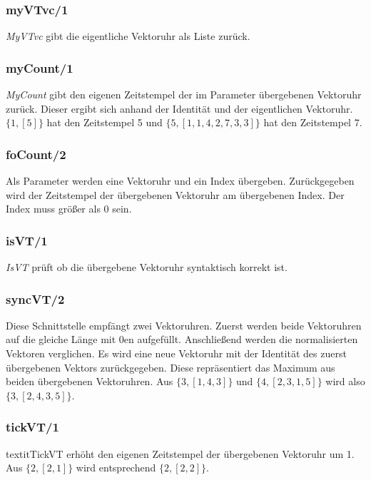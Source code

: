 \subsubsection{myVTvc/1}

\textit{MyVTvc} gibt die eigentliche Vektoruhr als Liste zurück.

\subsubsection{myCount/1}

\textit{MyCount} gibt den eigenen Zeitstempel der im Parameter übergebenen Vektoruhr zurück. Dieser ergibt sich anhand der Identität und der eigentlichen Vektoruhr. $\{1, [5]\}$ hat den Zeitstempel 5 und $\{5, [1,1,4,2,7,3,3]\}$ hat den Zeitstempel 7.

\subsubsection{foCount/2}

Als Parameter werden eine Vektoruhr und ein Index übergeben. Zurückgegeben wird der Zeitstempel der übergebenen Vektoruhr am übergebenen Index. Der Index muss größer als 0 sein.

\subsubsection{isVT/1}

\textit{IsVT} prüft ob die übergebene Vektoruhr syntaktisch korrekt ist.

\subsubsection{syncVT/2}

Diese Schnittstelle empfängt zwei Vektoruhren. Zuerst werden beide Vektoruhren auf die gleiche Länge mit 0en aufgefüllt. Anschließend werden die normalisierten Vektoren verglichen. Es wird eine neue Vektoruhr mit der Identität des zuerst übergebenen Vektors zurückgegeben. Diese repräsentiert das Maximum aus beiden übergebenen Vektoruhren. Aus $\{3, [1,4,3]\}$ und $\{4, [2,3,1,5]\}$ wird also $\{3, [2,4,3,5]\}$. 

\subsubsection{tickVT/1}

textit{TickVT} erhöht den eigenen Zeitstempel der übergebenen Vektoruhr um 1. Aus $\{2, [2,1]\}$ wird entsprechend $\{2, [2,2]\}$.

